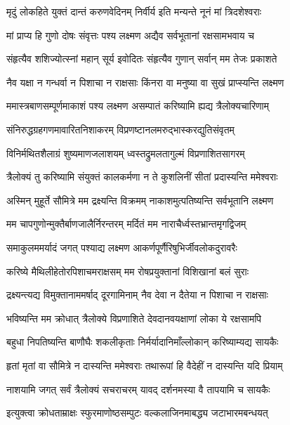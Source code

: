 \twolineshloka
{मृदुं लोकहिते युक्तं दान्तं करुणवेदिनम्}
{निर्वीर्य इति मन्यन्ते नूनं मां त्रिदशेश्वराः} %

\twolineshloka
{मां प्राप्य हि गुणो दोषः संवृत्तः पश्य लक्ष्मण}
{अद्यैव सर्वभूतानां रक्षसामभवाय च} %

\twolineshloka
{संहृत्यैव शशिज्योत्स्नां महान् सूर्य इवोदितः}
{संहृत्यैव गुणान् सर्वान् मम तेजः प्रकाशते} %

\twolineshloka
{नैव यक्षा न गन्धर्वा न पिशाचा न राक्षसाः}
{किंनरा वा मनुष्या वा सुखं प्राप्स्यन्ति लक्ष्मण} %

\twolineshloka
{ममास्त्रबाणसम्पूर्णमाकाशं पश्य लक्ष्मण}
{असम्पातं करिष्यामि ह्यद्य त्रैलोक्यचारिणाम्} %

\twolineshloka
{संनिरुद्धग्रहगणमावारितनिशाकरम्}
{विप्रणष्टानलमरुद्भास्करद्युतिसंवृतम्} %

\twolineshloka
{विनिर्मथितशैलाग्रं शुष्यमाणजलाशयम्}
{ध्वस्तद्रुमलतागुल्मं विप्रणाशितसागरम्} %

\twolineshloka
{त्रैलोक्यं तु करिष्यामि संयुक्तं कालकर्मणा}
{न ते कुशलिनीं सीतां प्रदास्यन्ति ममेश्वराः} %

\twolineshloka
{अस्मिन् मुहूर्ते सौमित्रे मम द्रक्ष्यन्ति विक्रमम्}
{नाकाशमुत्पतिष्यन्ति सर्वभूतानि लक्ष्मण} %

\twolineshloka
{मम चापगुणोन्मुक्तैर्बाणजालैर्निरन्तरम्}
{मर्दितं मम नाराचैर्ध्वस्तभ्रान्तमृगद्विजम्} %

\twolineshloka
{समाकुलममर्यादं जगत् पश्याद्य लक्ष्मण}
{आकर्णपूर्णैरिषुभिर्जीवलोकदुरावरैः} %

\twolineshloka
{करिष्ये मैथिलीहेतोरपिशाचमराक्षसम्}
{मम रोषप्रयुक्तानां विशिखानां बलं सुराः} %

\twolineshloka
{द्रक्ष्यन्त्यद्य विमुक्तानाममर्षाद् दूरगामिनाम्}
{नैव देवा न दैतेया न पिशाचा न राक्षसाः} %

\twolineshloka
{भविष्यन्ति मम क्रोधात् त्रैलोक्ये विप्रणाशिते}
{देवदानवयक्षाणां लोका ये रक्षसामपि} %

\twolineshloka
{बहुधा निपतिष्यन्ति बाणौघैः शकलीकृताः}
{निर्मर्यादानिमाँल्लोकान् करिष्याम्यद्य सायकैः} %

\twolineshloka
{हृतां मृतां वा सौमित्रे न दास्यन्ति ममेश्वराः}
{तथारूपां हि वैदेहीं न दास्यन्ति यदि प्रियाम्} %

\twolineshloka
{नाशयामि जगत् सर्वं त्रैलोक्यं सचराचरम्}
{यावद् दर्शनमस्या वै तापयामि च सायकैः} %

\twolineshloka
{इत्युक्त्वा क्रोधताम्राक्षः स्फुरमाणोष्ठसम्पुटः}
{वल्कलाजिनमाबद्ध्य जटाभारमबन्धयत्} %


